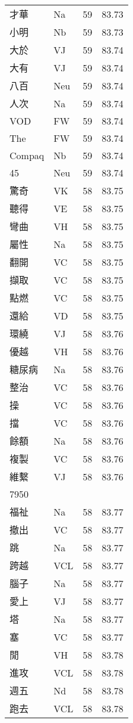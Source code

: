 \documentclass[twocolumn]{book}
\begin{document}
\begin{supertabular}{llrr}
才華 & Na & 59 &  83.73\\
小明 & Nb & 59 &  83.73\\
大於 & VJ & 59 &  83.74\\
大有 & VJ & 59 &  83.74\\
八百 & Neu & 59 &  83.74\\
人次 & Na & 59 &  83.74\\
VOD & FW & 59 &  83.74\\
The & FW & 59 &  83.74\\
Compaq & Nb & 59 &  83.74\\
45 & Neu & 59 &  83.74\\
驚奇 & VK & 58 &  83.75\\
聽得 & VE & 58 &  83.75\\
彎曲 & VH & 58 &  83.75\\
屬性 & Na & 58 &  83.75\\
翻開 & VC & 58 &  83.75\\
擷取 & VC & 58 &  83.75\\
點燃 & VC & 58 &  83.75\\
還給 & VD & 58 &  83.75\\
環繞 & VJ & 58 &  83.76\\
優越 & VH & 58 &  83.76\\
糖尿病 & Na & 58 &  83.76\\
整治 & VC & 58 &  83.76\\
操 & VC & 58 &  83.76\\
擋 & VC & 58 &  83.76\\
餘額 & Na & 58 &  83.76\\
複製 & VC & 58 &  83.76\\
維繫 & VJ & 58 &  83.76\\
7950\\
福祉 & Na & 58 &  83.77\\
撤出 & VC & 58 &  83.77\\
跳 & Na & 58 &  83.77\\
跨越 & VCL & 58 &  83.77\\
腦子 & Na & 58 &  83.77\\
愛上 & VJ & 58 &  83.77\\
塔 & Na & 58 &  83.77\\
塞 & VC & 58 &  83.77\\
閒 & VH & 58 &  83.78\\
進攻 & VCL & 58 &  83.78\\
週五 & Nd & 58 &  83.78\\
跑去 & VCL & 58 &  83.78\\

\end{supertabular}
\end{document}
